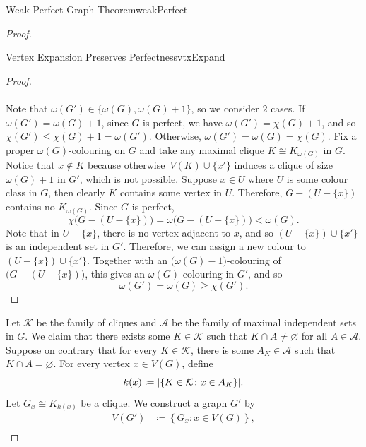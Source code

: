 \documentclass[math]{amznotes}
\theoremstyle{remark}
\newcommand{\0}{\mathbf{0}}
\newcommand{\1}{\mathbf{1}}
\begin{document}
\begin{thmbox}{Weak Perfect Graph Theorem}{weakPerfect}
\begin{proof}
\begin{lembox}{Vertex Expansion Preserves Perfectness}{vtxExpand}
\begin{proof}
                \\\\
                Note that $\omega(G') \in \{\omega(G), \omega(G) + 1\}$, so we consider $2$ cases. If $\omega(G') = \omega(G) + 1$, since $G$ is perfect, we have $\omega(G') = \chi(G) + 1$, and so $\chi(G') \leq \chi(G) + 1 = \omega(G')$. Otherwise, $\omega(G') = \omega(G) = \chi(G)$. Fix a proper $\omega(G)$-colouring on $G$ and take any maximal clique $K \cong K_{\omega(G)}$ in $G$. Notice that $x \notin K$ because otherwise~$V(K) \cup \{x'\}$ induces a clique of size $\omega(G) + 1$ in $G'$, which is not possible. Suppose $x \in U$ where $U$ is some colour class in $G$, then clearly $K$ contains some vertex in $U$. Therefore, $G - (U - \{x\})$ contains no $K_{\omega(G)}$. Since $G$ is perfect,
                \begin{equation*}
                    \chi\bigl(G - (U - \{x\})\bigr) = \omega\bigl(G - (U - \{x\})\bigr) < \omega(G).
                \end{equation*}
                Note that in $U - \{x\}$, there is no vertex adjacent to $x$, and so $(U - \{x\}) \cup \{x'\}$ is an independent set in $G'$. Therefore, we can assign a new colour to $(U - \{x\}) \cup \{x'\}$. Together with an $\bigl(\omega(G) - 1\bigr)$-colouring of $\bigl(G - (U - \{x\})\bigr)$, this gives an $\omega(G)$-colouring in $G'$, and so 
                \begin{equation*}
                    \omega(G') = \omega(G) \geq \chi(G').
                \end{equation*}
            \end{proof}
        \end{lembox}
        Let $\mathcal{K}$ be the family of cliques and $\mathcal{A}$ be the family of maximal independent sets in $G$. We claim that there exists some $K \in \mathcal{K}$ such that $K \cap A \neq \varnothing$ for all $A \in \mathcal{A}$. Suppose on contrary that for every $K \in \mathcal{K}$, there is some $A_K \in \mathcal{A}$ such that $K \cap A = \varnothing$. For every vertex $x \in V(G)$, define 
        \begin{equation*}
            k(x) \coloneqq {\left\lvert {\left\{K \in \mathcal{K} \colon x \in A_K\right\}} \right\rvert}.
        \end{equation*}
        Let $G_x \cong K_{k(x)}$ be a clique. We construct a graph $G'$ by 
        \begin{align*}
            V(G') & \coloneqq \left\{G_x \colon x \in V(G)\right\}, \\

\end{align*}
\end{proof}
\end{thmbox}
\end{document}
